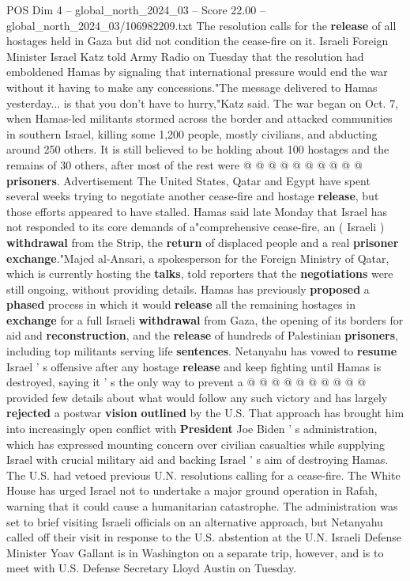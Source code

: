 \begin{textsample}{POS Dim 4 – global\_north\_2024\_03 – Score 22.00 – global\_north\_2024\_03/106982209.txt}
The resolution calls for the \textbf{release} of all hostages held in Gaza but did not condition the cease-fire on it.
Israeli Foreign Minister Israel Katz told Army Radio on Tuesday that the resolution had emboldened Hamas by signaling that international pressure would end the war without it having to make any concessions."The message delivered to Hamas yesterday... is that you don't have to hurry,"Katz said.
The war began on Oct. 7, when Hamas-led militants stormed across the border and attacked communities in southern Israel, killing some 1,200 people, mostly civilians, and abducting around 250 others.
It is still believed to be holding about 100 hostages and the remains of 30 others, after most of the rest were @ @ @ @ @ @ @ @ @ @ \textbf{prisoners}.
Advertisement The United States, Qatar and Egypt have spent several weeks trying to negotiate another cease-fire and hostage \textbf{release}, but those efforts appeared to have stalled.
Hamas said late Monday that Israel has not responded to its core demands of a"comprehensive cease-fire, an ( Israeli ) \textbf{withdrawal} from the Strip, the \textbf{return} of displaced people and a real \textbf{prisoner} \textbf{exchange}."Majed al-Ansari, a spokesperson for the Foreign Ministry of Qatar, which is currently hosting the \textbf{talks}, told reporters that the \textbf{negotiations} were still ongoing, without providing details.
Hamas has previously \textbf{proposed} a \textbf{phased} process in which it would \textbf{release} all the remaining hostages in \textbf{exchange} for a full Israeli \textbf{withdrawal} from Gaza, the opening of its borders for aid and \textbf{reconstruction}, and the \textbf{release} of hundreds of Palestinian \textbf{prisoners}, including top militants serving life \textbf{sentences}.
Netanyahu has vowed to \textbf{resume} Israel ' s offensive after any hostage \textbf{release} and keep fighting until Hamas is destroyed, saying it ' s the only way to prevent a @ @ @ @ @ @ @ @ @ @ provided few details about what would follow any such victory and has largely \textbf{rejected} a postwar \textbf{vision} \textbf{outlined} by the U.S.
That approach has brought him into increasingly open conflict with \textbf{President} Joe Biden ' s administration, which has expressed mounting concern over civilian casualties while supplying Israel with crucial military aid and backing Israel ' s aim of destroying Hamas.
The U.S. had vetoed previous U.N. resolutions calling for a cease-fire.
The White House has urged Israel not to undertake a major ground operation in Rafah, warning that it could cause a humanitarian catastrophe.
The administration was set to brief visiting Israeli officials on an alternative approach, but Netanyahu called off their visit in response to the U.S. abstention at the U.N.
Israeli Defense Minister Yoav Gallant is in Washington on a separate trip, however, and is to meet with U.S.
Defense Secretary Lloyd Austin on Tuesday.

\end{textsample}
